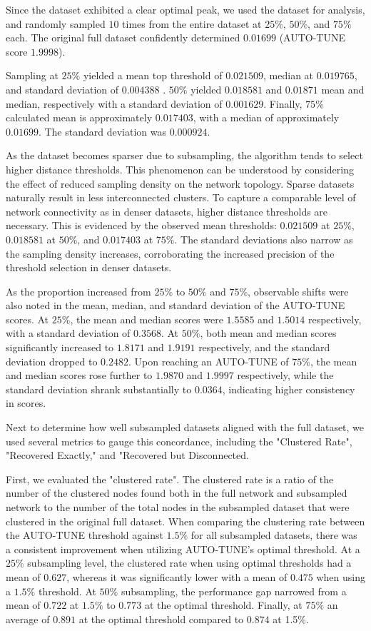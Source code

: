 \documentclass[utf8]{FrontiersinHarvard} %
\begin{document}
Since the \citep{rhee_national_2019} dataset exhibited a clear optimal peak, we
used the dataset for analysis, and randomly sampled $10$ times from the entire
dataset at $25\%$, $50\%$, and $75\%$ each. The original full dataset
confidently determined $0.01699$ (AUTO-TUNE score $1.9998$).

Sampling at $25\%$ yielded a mean top threshold of $0.021509$, median at
$0.019765$, and standard deviation of $0.004388$ \label{fig:subsampling}.
$50\%$ yielded $0.018581$ and $0.01871$ mean and median, respectively with a
standard deviation of $0.001629$. Finally, $75\%$ calculated mean is
approximately $0.017403$, with a median of approximately $0.01699$. The
standard deviation was $0.000924$.

As the dataset becomes sparser due to subsampling, the algorithm tends to
select higher distance thresholds. This phenomenon can be understood by
considering the effect of reduced sampling density on the network topology.
Sparse datasets naturally result in less interconnected clusters. To capture a
comparable level of network connectivity as in denser datasets, higher distance
thresholds are necessary. This is evidenced by the observed mean thresholds:
\(0.021509\) at \(25\%\), \(0.018581\) at \(50\%\), and \(0.017403\) at
\(75\%\). The standard deviations also narrow as the sampling density
increases, corroborating the increased precision of the threshold selection in
denser datasets.

As the proportion increased from $25\%$ to $50\%$ and $75\%$, observable shifts
were also noted in the mean, median, and standard deviation of the AUTO-TUNE
scores. At $25\%$, the mean and median scores were $1.5585$ and $1.5014$
respectively, with a standard deviation of $0.3568$. At $50\%$, both mean and
median scores significantly increased to $1.8171$ and $1.9191$ respectively,
and the standard deviation dropped to $0.2482$. Upon reaching an AUTO-TUNE of
$75\%$, the mean and median scores rose further to $1.9870$ and $1.9997$
respectively, while the standard deviation shrank substantially to $0.0364$,
indicating higher consistency in scores.

Next to determine how well subsampled datasets aligned with the full dataset,
we used several metrics to gauge this concordance, including the "Clustered
Rate", "Recovered Exactly," and "Recovered but Disconnected.

First, we evaluated the "clustered rate". The clustered rate is a ratio of the
number of the clustered nodes found both in the full network and subsampled
network to the number of the total nodes in the subsampled dataset that were
clustered in the original full dataset. When comparing the clustering rate
between the AUTO-TUNE threshold against $1.5\%$ for all subsampled datasets,
there was a consistent improvement when utilizing AUTO-TUNE's optimal
threshold. At a $25\%$ subsampling level, the clustered rate when using optimal
thresholds had a mean of $0.627$, whereas it was significantly lower with a
mean of $0.475$ when using a $1.5\%$ threshold. At $50\%$ subsampling, the
performance gap narrowed from a mean of $0.722$ at $1.5\%$ to $0.773$ at the
optimal threshold. Finally, at $75\%$ an average of $0.891$ at the optimal
threshold compared to $0.874$ at 1.5\%.
\end{document}
